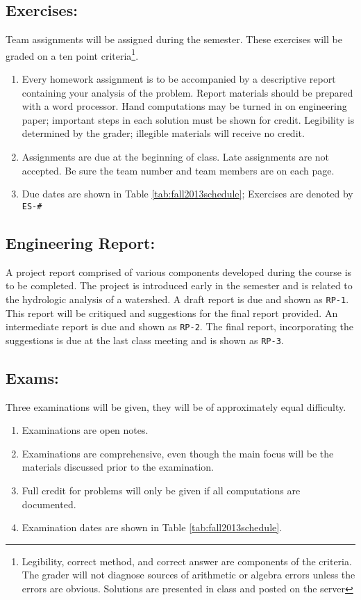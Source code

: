 \documentclass[12pt]{article}
\begin{document}
\subsection*{Exercises:} 
Team assignments will be assigned during the semester.  
These exercises will be graded on a ten point criteria\footnote{Legibility, correct method, and correct answer are components of the criteria.   The grader will not diagnose sources of arithmetic or algebra errors unless the errors are obvious.  Solutions are presented in class and posted on the server }.
\begin{enumerate}
\item Every homework assignment is to be accompanied by a descriptive report containing your analysis
of the problem. Report materials should be prepared with a word processor. 
Hand computations may be turned in on engineering paper; important steps in each solution must be shown for credit. 
Legibility is determined by the grader; illegible materials will receive no credit.
\item Assignments are due at the beginning of class. Late assignments are not accepted.  Be sure the team number and team members are on each page.
\item Due dates are shown in Table \ref{tab:fall2013schedule};  Exercises are denoted by \texttt{ES-\#}
\end{enumerate}

\subsection*{Engineering Report:}  
A project report comprised of various components developed during the course is to be completed.  The project is introduced early in the semester and is related to the hydrologic analysis of a watershed.   A draft report is due and shown as \texttt{RP-1}.   This report will be critiqued and suggestions for the final report provided.   An intermediate report is due and shown as \texttt{RP-2}.  The final report, incorporating the suggestions is due at the last class meeting and is shown as \texttt{RP-3}.

\subsection*{Exams:} Three examinations will be given, they will be of approximately equal difficulty.
\begin{enumerate}
\item Examinations are open notes.
\item Examinations are comprehensive, even though the main focus will be the materials discussed prior to the examination.
\item Full credit for problems will only be given if all computations are documented.
\item Examination dates are shown in Table \ref{tab:fall2013schedule}.
\end{enumerate}
\end{document}
